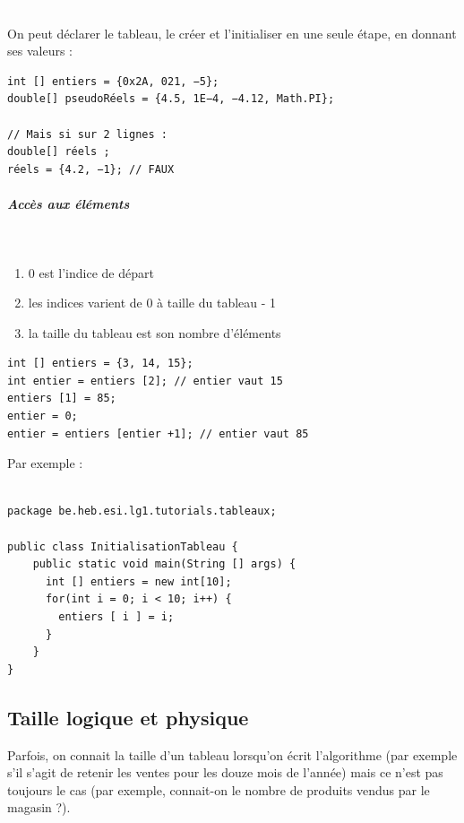 \documentclass[11pt,a4paper]{article}
\begin{document}
					\textcolor{white}{.} \par
				
        On peut d\'eclarer le tableau, le cr\'eer et l'initialiser en une seule \'etape, en donnant ses valeurs :
      
            \par
        \begin{verbatim}
int [] entiers = {0x2A, 021, −5};
double[] pseudoRéels = {4.5, 1E−4, −4.12, Math.PI};

// Mais si sur 2 lignes :
double[] réels ;
réels = {4.2, −1}; // FAUX
      \end{verbatim}
			
		\subparagraph{Acc\`es aux \'el\'ements} 
		
					\textcolor{white}{.} \par
				
					\begin{enumerate}
				
			\item 0 est l'indice de d\'epart
			\item les indices varient de 0 \`a taille du tableau - 1
			\item la taille du tableau est son nombre d'\'el\'ements
					\end{enumerate}
				
            \par
        \begin{verbatim}
int [] entiers = {3, 14, 15};
int entier = entiers [2]; // entier vaut 15
entiers [1] = 85;
entier = 0;
entier = entiers [entier +1]; // entier vaut 85
      \end{verbatim}Par exemple :
            \par
        \begin{verbatim}

package be.heb.esi.lg1.tutorials.tableaux;

public class InitialisationTableau {
    public static void main(String [] args) {
      int [] entiers = new int[10];
      for(int i = 0; i < 10; i++) {
        entiers [ i ] = i;
      }
    }
}\end{verbatim}\subsection{Taille logique et physique}
		    Parfois, on connait la taille d'un tableau lorsqu'on \'ecrit l'algorithme (par exemple s'il s'agit
        de retenir les ventes pour les douze mois de l'ann\'ee) mais ce n'est pas toujours le cas (par
        exemple, connait-on le nombre de produits vendus par le magasin ?).
		  
\end{document}

